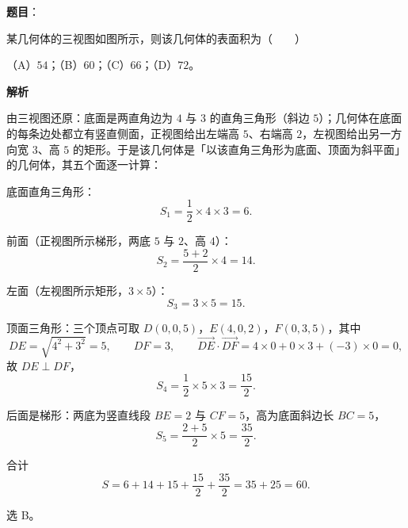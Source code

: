 \begin{answer}

\textbf{题目}：

某几何体的三视图如图所示，则该几何体的表面积为\mbox{（　　）}

（A）$54$；（B）$60$；（C）$66$；（D）$72$。
\nopagebreak[4]
\begin{center}\end{center}
\nopagebreak[4]
\textbf{解析}

由三视图还原：底面是两直角边为 $4$ 与 $3$ 的直角三角形（斜边 $5$）；几何体在底面的每条边处都立有竖直侧面，正视图给出左端高 $5$、右端高 $2$，左视图给出另一方向宽 $3$、高 $5$ 的矩形。于是该几何体是「以该直角三角形为底面、顶面为斜平面」的几何体，其五个面逐一计算：

底面直角三角形：
\nopagebreak[4]
\[S_1=\frac12\times4\times3=6 .\]

前面（正视图所示梯形，两底 $5$ 与 $2$、高 $4$）：
\nopagebreak[4]
\[S_2=\frac{5+2}2\times4=14 .\]

左面（左视图所示矩形，$3\times5$）：
\nopagebreak[4]
\[S_3=3\times5=15 .\]

顶面三角形：三个顶点可取 $D(0,0,5)$，$E(4,0,2)$，$F(0,3,5)$，其中
\nopagebreak[4]
\[DE=\sqrt{4^2+3^2}=5,\qquad DF=3,\qquad \overrightarrow{DE}\cdot\overrightarrow{DF}=4\times0+0\times3+(-3)\times0=0,\]
故 $DE\perp DF$，
\nopagebreak[4]
\[S_4=\frac12\times5\times3=\frac{15}2 .\]

后面是梯形：两底为竖直线段 $BE=2$ 与 $CF=5$，高为底面斜边长 $BC=5$，
\nopagebreak[4]
\[S_5=\frac{2+5}2\times5=\frac{35}2 .\]

合计
\nopagebreak[4]
\[S=6+14+15+\frac{15}2+\frac{35}2=35+25=60 .\]

选 B。


\end{answer}
